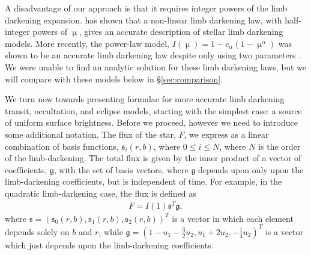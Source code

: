 \documentclass[modern]{aastex61}
\begin{document}
A disadvantage of our approach is that it requires integer powers of the limb darkening
expansion.  \citet{Claret2000} has shown that a non-linear limb darkening law,
with half-integer powers of $\upmu$, gives an accurate description of stellar
limb darkening models.  More recently, the power-law model, $I(\upmu) = 1-
c_\alpha(1-\upmu^\alpha)$ \citep{Hestroffer1997} was shown to be an accurate
limb darkening law despite only using two parameters \citep{Morello2017,Maxted2018}.  
We were unable to find an analytic solution for these limb darkening
laws, but we will compare with these models below in \S \ref{sec:comparison}.

We turn now towards presenting formulae for more accurate limb darkening transit,
occultation, and eclipse models, starting with the simplest case:  a source
of uniform surface brightness.  Before we proceed, however we need to
introduce some additional notation.  The flux of the star, $F$, we express as a linear
combination of basis functions, $\mathfrak{s}_i(r,b)$, where $0 \le i \le N$, where
$N$ is the order of the limb-darkening.  The total flux is given by the inner product
of a vector of coefficients, $\mathfrak{g}$, with the set of basis vectors, where
$\mathfrak{g}$ depends upon only upon the limb-darkening coefficients, but is
independent of time.  For example, in the quadratic limb-darkening case, the
flux is defined as
\begin{eqnarray}
F = I(1) \mathfrak{s}^T \mathfrak{g},
\end{eqnarray}
where $\mathfrak{s} = \left(\mathfrak{s}_0(r,b),\mathfrak{s}_1(r,b),\mathfrak{s}_2(r,b)\right)^T$ is 
a vector in which each element depends solely on $b$ and $r$, 
while $\mathfrak{g} = \left(1-u_1-\tfrac{3}{2}u_2,u_1+2u_2,-\tfrac{1}{4}u_2\right)^T$
is a vector which just depends upon the limb-darkening coefficients.



%
\end{document}

